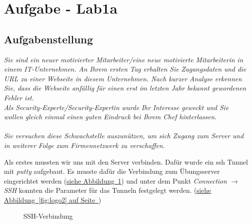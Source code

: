 \documentclass[12pt,a4paper,titlepage,oneside]{scrartcl}
\begin{document}
\maketitle
\setcounter{section}{0}
\setcounter{tocdepth}{2}
\tableofcontents

%
%

\section{Aufgabe - Lab1a}

\subsection{Aufgabenstellung}
\emph{Sie sind ein neuer motivierter Mitarbeiter/eine neue motivierte Mitarbeiterin in einem IT-Unternehmen. An Ihrem ersten Tag erhalten Sie Zugangsdaten und die URL zu einer Webseite in diesem Unternehmen. Nach kurzer Analyse erkennen Sie, dass die Webseite anfällig für einen erst im letzten Jahr bekannt gewordenen Fehler ist. \\Als Security-Experte/Security-Expertin wurde Ihr Interesse geweckt und Sie wollen gleich einmal einen guten Eindruck bei Ihrem Chef hinterlassen.\\\\
Sie versuchen diese Schwachstelle auszunützen, um sich Zugang zum Server und in weiterer Folge zum Firmennetzwerk zu verschaffen.}

Als erstes mussten wir uns mit den Server verbinden. Dafür wurde ein ssh Tunnel mit \textit{putty} aufgebaut.
Es musste dafür die Verbindung zum Übungsserver eingerichtet werden (\hyperref[fig:logo1]{siehe Abbildung~\ref*{fig:logo1}}) und unter dem Punkt \textit{Connection} $\rightarrow$ \textit{SSH} konnten die Parameter für das Tunneln festgelegt werden. (\hyperref[fig:logo2]{siehe Abbildung~\ref*{fig:logo2} auf Seite~\pageref*{fig:logo2}})

\begin{figure}[h!]
  \centering
  \caption{SSH-Verbindung}
  \label{fig:logo1}
\end{figure}
\end{document}
